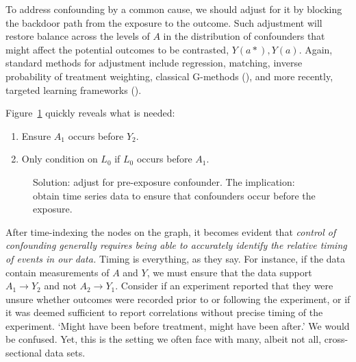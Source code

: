 \documentclass[
  singlecolumn]{article}
\providecommand{\tightlist}{%
  \setlength{\itemsep}{0pt}\setlength{\parskip}{0pt}}\usepackage{longtable,booktabs,array}
\begin{document}
To address confounding by a common cause, we should adjust for it by
blocking the backdoor path from the exposure to the outcome. Such
adjustment will restore balance across the levels of \(A\) in the
distribution of confounders that might affect the potential outcomes to
be contrasted, \(Y(a*), Y(a)\). Again, standard methods for adjustment
include regression, matching, inverse probability of treatment
weighting, classical G-methods (), and more recently, targeted learning frameworks
().

Figure~\ref{fig-dag-common-cause-solution} quickly reveals what is
needed:

\begin{enumerate}
\def\labelenumi{\arabic{enumi}.}
\tightlist
\item
  Ensure \(A_1\) occurs before \(Y_2\).
\item
  Only condition on \(L_0\) if \(L_0\) occurs before \(A_1\).
\end{enumerate}

\begin{figure}


\caption{\label{fig-dag-common-cause-solution}Solution: adjust for
pre-exposure confounder. The implication: obtain time series data to
ensure that confounders occur before the exposure.}

\end{figure}%

After time-indexing the nodes on the graph, it becomes evident that
\emph{control of confounding generally requires being able to accurately
identify the relative timing of events in our data.} Timing is
everything, as they say. For instance, if the data contain measurements
of \(A\) and \(Y\), we must ensure that the data support \(A_1\to Y_2\)
and not \(A_2 \to Y_1\). Consider if an experiment reported that they
were unsure whether outcomes were recorded prior to or following the
experiment, or if it was deemed sufficient to report correlations
without precise timing of the experiment. `Might have been before
treatment, might have been after.' We would be confused. Yet, this is
the setting we often face with many, albeit not all, cross-sectional
data sets.
\end{document}
